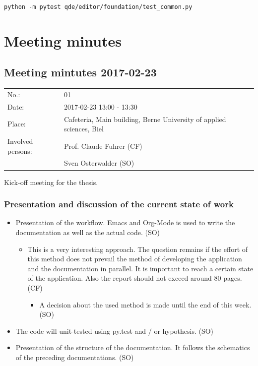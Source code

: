 \documentclass[10pt, openright, notitlepage]{scrreprt}
\begin{document}
\begin{verbatim}
python -m pytest qde/editor/foundation/test_common.py
\end{verbatim}


\section{Meeting minutes}
\label{sec:org2c260f1}

\subsection{Meeting mintutes 2017-02-23}
\label{sec:orgfc4a0e1}

\begin{center}
\begin{tabular}{ll}
No.: & 01\\
Date: & 2017-02-23 13:00 - 13:30\\
Place: & Cafeteria, Main building, Berne University of applied sciences, Biel\\
Involved persons: & Prof. Claude Fuhrer (CF)\\
 & Sven Osterwalder (SO)\\
\end{tabular}
\end{center}

Kick-off meeting for the thesis.

\subsubsection{Presentation and discussion of the current state of work}
\label{sec:orgb882440}

\begin{itemize}
\item Presentation of the workflow. Emacs and Org-Mode is used to write the
documentation as well as the actual code. (SO)
\begin{itemize}
\item This is a very interesting approach. The question remains if the effort of
this method does not prevail the method of developing the application and
the documentation in parallel. It is important to reach a certain state of
the application. Also the report should not exceed around 80 pages. (CF)
\begin{itemize}
\item A decision about the used method is made until the end of this week. (SO)
\end{itemize}
\end{itemize}
\item The code will unit-tested using py.test and / or hypothesis. (SO)
\item Presentation of the structure of the documentation. It follows the schematics
of the preceding documentations. (SO)
\end{itemize}
\end{document}
